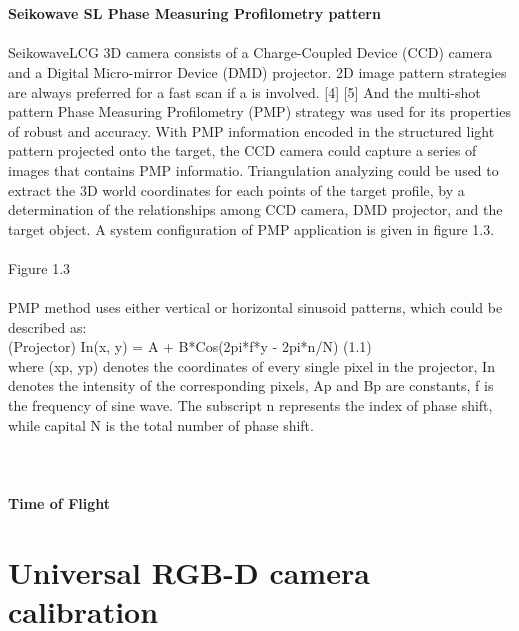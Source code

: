 \\
\\\textbf{Seikowave SL Phase Measuring Profilometry pattern}\\\\%
SeikowaveLCG 3D camera consists of a Charge-Coupled Device (CCD) camera and a Digital Micro-mirror Device (DMD) projector. 2D image pattern strategies are always preferred for a fast scan if a is involved. 
[4]%
 [5] %
And the multi-shot pattern Phase Measuring Profilometry (PMP) strategy was used for its properties of robust and accuracy.
With PMP information encoded in the structured light pattern projected onto the target, the CCD camera could capture a series of images that contains PMP informatio. Triangulation analyzing could be used to extract the 3D world coordinates for each points of the target profile, by a determination of the relationships among CCD camera, DMD projector, and the target object. A system configuration of PMP application is given in figure 1.3.
 \\\\Figure 1.3\\%
 \\
 PMP  method uses either vertical or horizontal sinusoid patterns, which could be described as:\\
 (Projector) In(x, y) = A + B*Cos(2pi*f*y - 2pi*n/N)	   (1.1)%
 \\where (xp, yp) denotes the coordinates of every single pixel in the projector, In denotes the intensity of the corresponding pixels, Ap and Bp are constants, f is the frequency of sine wave. The subscript n represents the index of phase shift, while capital N is the total number of phase shift. \\
\\
\\
\\\textbf {Time of Flight}\\
 
 \section{Universal RGB-D camera calibration} %




